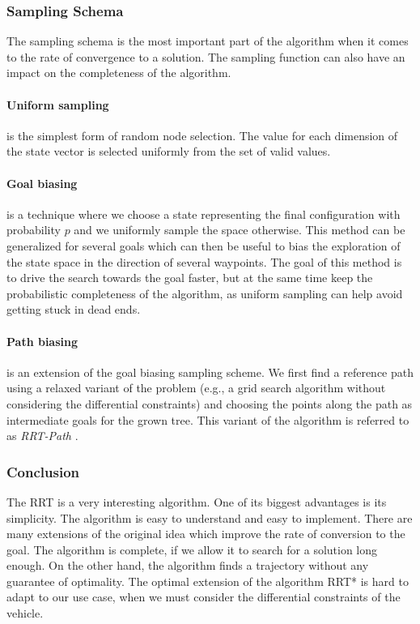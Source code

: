 \subsubsection{Sampling Schema}

The sampling schema is the most important part of the algorithm when it comes to the rate of convergence to a solution. The sampling function can also have an impact on the completeness of the algorithm.

\paragraph{Uniform sampling} is the simplest form of random node selection. The value for each dimension of the state vector is selected uniformly from the set of valid values.

\paragraph{Goal biasing} is a technique where we choose a state representing the final configuration with probability $p$ and we uniformly sample the space otherwise. This method can be generalized for several goals which can then be useful to bias the exploration of the state space in the direction of several waypoints. The goal of this method is to drive the search towards the goal faster, but at the same time keep the probabilistic completeness of the algorithm, as uniform sampling can help avoid getting stuck in dead ends.

\paragraph{Path biasing} is an extension of the goal biasing sampling scheme. We first find a reference path using a relaxed variant of the problem (e.g., a grid search algorithm without considering the differential constraints) and choosing the points along the path as intermediate goals for the grown tree. This variant of the algorithm is referred to as \textit{RRT-Path} \cite{RRT_guiding_path}.

\subsubsection{Conclusion}

The \gls*{RRT} is a very interesting algorithm. One of its biggest advantages is its simplicity. The algorithm is easy to understand and easy to implement. There are many extensions of the original idea which improve the rate of conversion to the goal. The algorithm is complete, if we allow it to search for a solution long enough. On the other hand, the algorithm finds a trajectory without any guarantee of optimality. The optimal extension of the algorithm \gls{RRT*} is hard to adapt to our use case, when we must consider the differential constraints of the vehicle.

